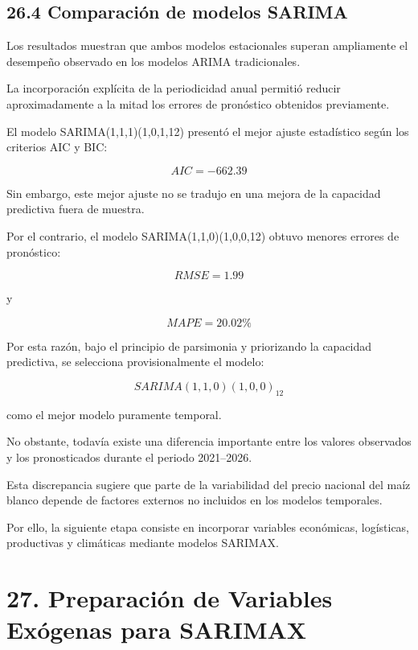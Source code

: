\documentclass[11pt]{article}
\begin{document}
    \hypertarget{comparaciuxf3n-de-modelos-sarima}{%
\subsection{26.4 Comparación de modelos
SARIMA}\label{comparaciuxf3n-de-modelos-sarima}}

Los resultados muestran que ambos modelos estacionales superan
ampliamente el desempeño observado en los modelos ARIMA tradicionales.

La incorporación explícita de la periodicidad anual permitió reducir
aproximadamente a la mitad los errores de pronóstico obtenidos
previamente.

El modelo SARIMA(1,1,1)(1,0,1,12) presentó el mejor ajuste estadístico
según los criterios AIC y BIC:

\[
AIC=-662.39
\]

Sin embargo, este mejor ajuste no se tradujo en una mejora de la
capacidad predictiva fuera de muestra.

Por el contrario, el modelo SARIMA(1,1,0)(1,0,0,12) obtuvo menores
errores de pronóstico:

\[
RMSE = 1.99
\]

y

\[
MAPE = 20.02\%
\]

Por esta razón, bajo el principio de parsimonia y priorizando la
capacidad predictiva, se selecciona provisionalmente el modelo:

\[
SARIMA(1,1,0)(1,0,0)_{12}
\]

como el mejor modelo puramente temporal.

No obstante, todavía existe una diferencia importante entre los valores
observados y los pronosticados durante el periodo 2021--2026.

Esta discrepancia sugiere que parte de la variabilidad del precio
nacional del maíz blanco depende de factores externos no incluidos en
los modelos temporales.

Por ello, la siguiente etapa consiste en incorporar variables
económicas, logísticas, productivas y climáticas mediante modelos
SARIMAX.

    \hypertarget{preparaciuxf3n-de-variables-exuxf3genas-para-sarimax}{%
\section{27. Preparación de Variables Exógenas para
SARIMAX}\label{preparaciuxf3n-de-variables-exuxf3genas-para-sarimax}}
\end{document}
